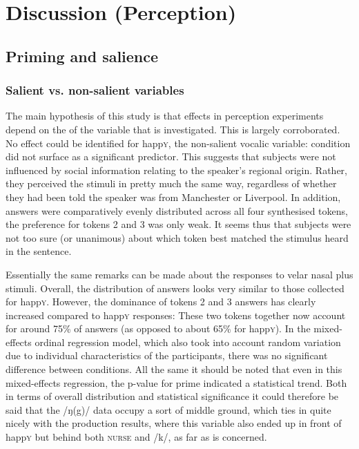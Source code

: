 	\chapter{Discussion (Perception)}
	\label{ch.perc_disc}

	\section{Priming and salience}
		\label{sec.perc_res.disc.salience}

		\subsection{Salient vs. non-salient variables}
		
The main hypothesis of this study is that  effects in perception experiments depend on the  of the variable that is investigated.
This is largely corroborated.
No  effect could be identified for happ\textsc{y}, the non-salient vocalic variable:  condition did not surface as a significant predictor.
This suggests that subjects were not influenced by social information relating to the speaker's regional origin.
Rather, they perceived the stimuli in pretty much the same way, regardless of whether they had been told the speaker was from Manchester or Liverpool.
In addition, answers were comparatively evenly distributed across all four synthesised tokens, the preference for tokens 2 and 3 was only weak.
It seems thus that subjects were not too sure (or unanimous) about which token best matched the stimulus heard in the sentence.

Essentially the same remarks can be made about the responses to velar nasal plus stimuli.
Overall, the distribution of answers looks very similar to those collected for happ\textsc{y}.
However, the dominance of tokens 2 and 3 answers has clearly increased compared to happ\textsc{y} responses: These two tokens together now account for around 75\% of answers (as opposed to about 65\% for happ\textsc{y}).
In the mixed-effects ordinal regression model, which also took into account random variation due to individual characteristics of the participants, there was no significant difference between  conditions.
All the same it should be noted that even in this mixed-effects regression, the p-value for prime indicated a statistical trend.
Both in terms of overall distribution and statistical significance it could therefore be said that the /ŋ(g)/ data occupy a sort of middle ground, which ties in quite nicely with the production results, where this variable also ended up in front of happ\textsc{y} but behind both \textsc{nurse} and /k/, as far as  is concerned.

